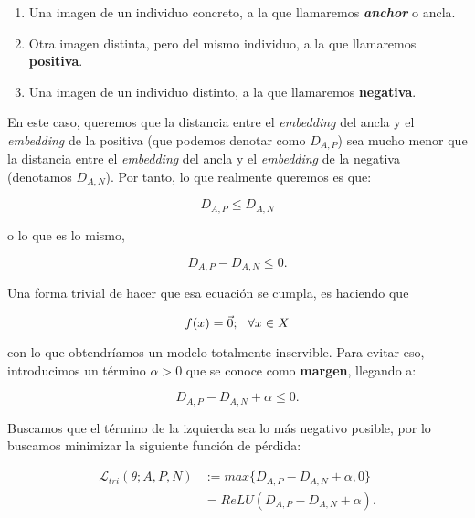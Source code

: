 \begin{enumerate}
	\item Una imagen de un individuo concreto, a la que llamaremos \textbf{\textit{anchor}} o ancla.
	\item Otra imagen distinta, pero del mismo individuo, a la que llamaremos \textbf{positiva}.
	\item Una imagen de un individuo distinto, a la que llamaremos \textbf{negativa}.
\end{enumerate}

En este caso, queremos que la distancia entre el \textit{embedding} del ancla y el \textit{embedding} de la positiva (que podemos denotar como $D_{A, P}$) sea mucho menor que la distancia entre el \textit{embedding} del ancla y el \textit{embedding} de la negativa (denotamos $D_{A, N}$). Por tanto, lo que realmente queremos es que:

\begin{equation}
	D_{A, P} \leq D_{A, N}
\end{equation}

o lo que es lo mismo,

\begin{equation}
	D_{A, P} - D_{A, N} \leq 0.
\end{equation}

Una forma trivial de hacer que esa ecuación se cumpla, es haciendo que

\begin{equation}
	f(x) = \vec{0}; \ \  \forall x \in X
\end{equation}

con lo que obtendríamos un modelo totalmente inservible. Para evitar eso, introducimos un término $\alpha > 0$ que se conoce como \textbf{margen}, llegando a:

\begin{equation}
	D_{A, P} - D_{A, N} + \alpha \leq 0.
\end{equation}

Buscamos que el término de la izquierda sea lo más negativo posible, por lo buscamos minimizar la siguiente función de pérdida:

\begin{equation} \label{ieq:triplet_loss_single_entry}
	\begin{split}
		\mathcal{L}_{tri}(\theta; A, P, N) & := max \{D_{A, P} - D_{A, N} + \alpha, 0 \} \\
		&= ReLU(D_{A, P} - D_{A, N} + \alpha).
	\end{split}
\end{equation}

